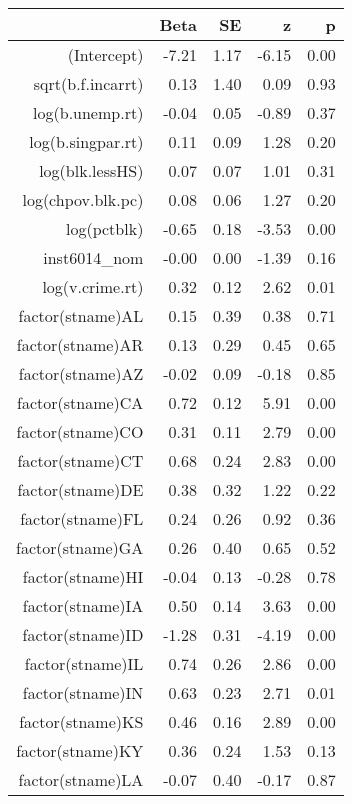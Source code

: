 \begin{table}[ht]
\centering
\begin{tabular}{rrrrr}
  \hline
 & Beta & SE & z & p \\ 
  \hline
(Intercept) & -7.21 & 1.17 & -6.15 & 0.00 \\ 
  sqrt(b.f.incarrt) & 0.13 & 1.40 & 0.09 & 0.93 \\ 
  log(b.unemp.rt) & -0.04 & 0.05 & -0.89 & 0.37 \\ 
  log(b.singpar.rt) & 0.11 & 0.09 & 1.28 & 0.20 \\ 
  log(blk.lessHS) & 0.07 & 0.07 & 1.01 & 0.31 \\ 
  log(chpov.blk.pc) & 0.08 & 0.06 & 1.27 & 0.20 \\ 
  log(pctblk) & -0.65 & 0.18 & -3.53 & 0.00 \\ 
  inst6014\_nom & -0.00 & 0.00 & -1.39 & 0.16 \\ 
  log(v.crime.rt) & 0.32 & 0.12 & 2.62 & 0.01 \\ 
  factor(stname)AL & 0.15 & 0.39 & 0.38 & 0.71 \\ 
  factor(stname)AR & 0.13 & 0.29 & 0.45 & 0.65 \\ 
  factor(stname)AZ & -0.02 & 0.09 & -0.18 & 0.85 \\ 
  factor(stname)CA & 0.72 & 0.12 & 5.91 & 0.00 \\ 
  factor(stname)CO & 0.31 & 0.11 & 2.79 & 0.00 \\ 
  factor(stname)CT & 0.68 & 0.24 & 2.83 & 0.00 \\ 
  factor(stname)DE & 0.38 & 0.32 & 1.22 & 0.22 \\ 
  factor(stname)FL & 0.24 & 0.26 & 0.92 & 0.36 \\ 
  factor(stname)GA & 0.26 & 0.40 & 0.65 & 0.52 \\ 
  factor(stname)HI & -0.04 & 0.13 & -0.28 & 0.78 \\ 
  factor(stname)IA & 0.50 & 0.14 & 3.63 & 0.00 \\ 
  factor(stname)ID & -1.28 & 0.31 & -4.19 & 0.00 \\ 
  factor(stname)IL & 0.74 & 0.26 & 2.86 & 0.00 \\ 
  factor(stname)IN & 0.63 & 0.23 & 2.71 & 0.01 \\ 
  factor(stname)KS & 0.46 & 0.16 & 2.89 & 0.00 \\ 
  factor(stname)KY & 0.36 & 0.24 & 1.53 & 0.13 \\ 
  factor(stname)LA & -0.07 & 0.40 & -0.17 & 0.87 \\ 

\end{tabular}
\end{table}
